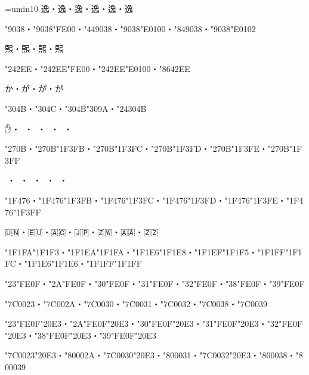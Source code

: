 
\parindent=0pt
\font\jpy=umin10
\jpy
逸・逸︀・逸︁・逸󠄀・逸󠄁・逸󠄂\par
\kchar"9038・\kchar"9038\kchar"FE00・\kchar"449038・\kchar"9038\kchar"E0100・\kchar"849038・\kchar"9038\kchar"E0102\par
𤋮・𤋮︀・𤋮󠄀・𤋮󠄁\par
\kchar"242EE・\kchar"242EE\kchar"FE00・\kchar"242EE\kchar"E0100・\kchar"8642EE\par
か・が・か゚・か゚\par
\kchar"304B・\kchar"304C・\kchar"304B\kchar"309A・\kchar"24304B\par
✋・✋🏻・✋🏼・✋🏽・✋🏾・✋🏿\par
\kchar"270B・\kchar"270B\kchar"1F3FB・\kchar"270B\kchar"1F3FC・\kchar"270B\kchar"1F3FD・\kchar"270B\kchar"1F3FE・\kchar"270B\kchar"1F3FF\par
👶・👶🏻・👶🏼・👶🏽・👶🏾・👶🏿\par
\kchar"1F476・\kchar"1F476\kchar"1F3FB・\kchar"1F476\kchar"1F3FC・\kchar"1F476\kchar"1F3FD・\kchar"1F476\kchar"1F3FE・\kchar"1F476\kchar"1F3FF\par
🇺🇳・🇪🇺・🇦🇨・🇯🇵・🇿🇼・🇦🇦・🇿🇿\par
\kchar"1F1FA\kchar"1F1F3・\kchar"1F1EA\kchar"1F1FA・\kchar"1F1E6\kchar"1F1E8・\kchar"1F1EF\kchar"1F1F5・\kchar"1F1FF\kchar"1F1FC・\kchar"1F1E6\kchar"1F1E6・\kchar"1F1FF\kchar"1F1FF\par
\kchar"23\kchar"FE0F・\kchar"2A\kchar"FE0F・\kchar"30\kchar"FE0F・\kchar"31\kchar"FE0F・\kchar"32\kchar"FE0F・\kchar"38\kchar"FE0F・\kchar"39\kchar"FE0F\par
\kchar"7C0023・\kchar"7C002A・\kchar"7C0030・\kchar"7C0031・\kchar"7C0032・\kchar"7C0038・\kchar"7C0039\par
\kchar"23\kchar"FE0F\kchar"20E3・\kchar"2A\kchar"FE0F\kchar"20E3・\kchar"30\kchar"FE0F\kchar"20E3・\kchar"31\kchar"FE0F\kchar"20E3・\kchar"32\kchar"FE0F\kchar"20E3・\kchar"38\kchar"FE0F\kchar"20E3・\kchar"39\kchar"FE0F\kchar"20E3\par
\kchar"7C0023\kchar"20E3・\kchar"80002A・\kchar"7C0030\kchar"20E3・\kchar"800031・\kchar"7C0032\kchar"20E3・\kchar"800038・\kchar"800039\par
\bye
